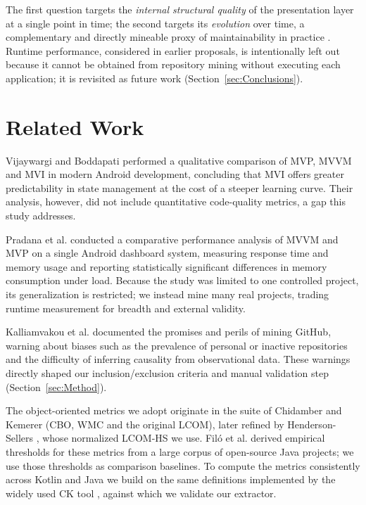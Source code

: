 \documentclass[conference]{IEEEtran}
\begin{document}
The first question targets the \emph{internal structural quality} of the
presentation layer at a single point in time; the second targets its
\emph{evolution} over time, a complementary and directly mineable proxy of
maintainability in practice \cite{Khomh:2009}. Runtime performance, considered
in earlier proposals, is intentionally left out because it cannot be obtained
from repository mining without executing each application; it is revisited as
future work (Section~\ref{sec:Conclusions}).

\section{Related Work} \label{sec:Related}

Vijaywargi and Boddapati \cite{Vijaywargi:2024} performed a qualitative
comparison of MVP, MVVM and MVI in modern Android development, concluding that
MVI offers greater predictability in state management at the cost of a steeper
learning curve. Their analysis, however, did not include quantitative
code-quality metrics, a gap this study addresses.

Pradana et al. \cite{Pradana:2025} conducted a comparative performance analysis
of MVVM and MVP on a single Android dashboard system, measuring response time
and memory usage and reporting statistically significant differences in memory
consumption under load. Because the study was limited to one controlled project,
its generalization is restricted; we instead mine many real projects, trading
runtime measurement for breadth and external validity.

Kalliamvakou et al. \cite{Kalliamvakou:2014} documented the promises and perils
of mining GitHub, warning about biases such as the prevalence of personal or
inactive repositories and the difficulty of inferring causality from
observational data. These warnings directly shaped our inclusion/exclusion
criteria and manual validation step (Section~\ref{sec:Method}).

The object-oriented metrics we adopt originate in the suite of Chidamber and
Kemerer \cite{ChidamberKemerer:1994} (CBO, WMC and the original LCOM), later
refined by Henderson-Sellers \cite{HendersonSellers:1996}, whose normalized
LCOM-HS we use. Fil\'o et al. \cite{Filo:2024} derived empirical thresholds for
these metrics from a large corpus of open-source Java projects; we use those
thresholds as comparison baselines. To compute the metrics consistently across
Kotlin and Java we build on the same definitions implemented by the widely used
CK tool \cite{Aniche:2015}, against which we validate our extractor.
\end{document}
